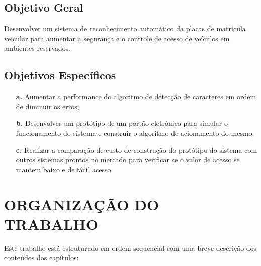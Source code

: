 \subsection{\textbf{Objetivo Geral}}

Desenvolver um sistema de reconhecimento automático da placas de matricula veicular para aumentar a segurança e o controle de acesso de veículos em ambientes reservados. 

\subsection{\textbf{Objetivos Específicos}}

\begin{itemize}
	\item [\textbf{a.}] Aumentar a performance do algoritmo de detecção de caracteres em ordem de diminuir os erros;
	\item [\textbf{b.}] Desenvolver um protótipo de um portão eletrônico para simular o funcionamento do sistema e construir o algoritmo de acionamento do mesmo;
	\item [\textbf{c.}] Realizar a comparação de custo de construção do protótipo do sistema com outros sistemas prontos no mercado para verificar se o valor de acesso se mantem baixo e de fácil acesso.
\end{itemize}

\section{\uppercase{Organização do Trabalho}}

Este trabalho está estruturado em ordem sequencial com uma breve descrição dos conteúdos dos capítulos:

